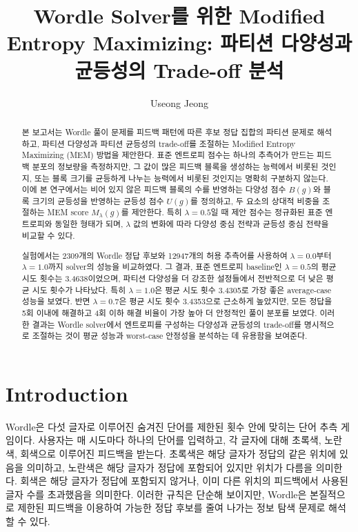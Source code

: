 \documentclass[11pt]{article}
\title{Wordle Solver를 위한 Modified Entropy Maximizing: 파티션 다양성과 균등성의 Trade-off 분석}
\author{
    Useong Jeong
}
\date{}
\begin{document}
\maketitle


\begin{abstract}
본 보고서는 Wordle 풀이 문제를 피드백 패턴에 따른 후보 정답 집합의 파티션 문제로 해석하고,
파티션 다양성과 파티션 균등성의 trade-off를 조절하는 Modified Entropy Maximizing (MEM) 방법을 제안한다.
표준 엔트로피 점수는 하나의 추측어가 만드는 피드백 분포의 정보량을 측정하지만,
그 값이 많은 피드백 블록을 생성하는 능력에서 비롯된 것인지,
또는 블록 크기를 균등하게 나누는 능력에서 비롯된 것인지는 명확히 구분하지 않는다.
이에 본 연구에서는 비어 있지 않은 피드백 블록의 수를 반영하는 다양성 점수 $B(g)$와
블록 크기의 균등성을 반영하는 균등성 점수 $U(g)$를 정의하고,
두 요소의 상대적 비중을 조절하는 MEM score $M_{\lambda}(g)$를 제안한다.
특히 $\lambda = 0.5$일 때 제안 점수는 정규화된 표준 엔트로피와 동일한 형태가 되며,
$\lambda$ 값의 변화에 따라 다양성 중심 전략과 균등성 중심 전략을 비교할 수 있다.

실험에서는 2309개의 Wordle 정답 후보와 12947개의 허용 추측어를 사용하여
$\lambda = 0.0$부터 $\lambda = 1.0$까지 solver의 성능을 비교하였다.
그 결과, 표준 엔트로피 baseline인 $\lambda = 0.5$의 평균 시도 횟수는 3.4638이었으며,
파티션 다양성을 더 강조한 설정들에서 전반적으로 더 낮은 평균 시도 횟수가 나타났다.
특히 $\lambda = 1.0$은 평균 시도 횟수 3.4305로 가장 좋은 average-case 성능을 보였다.
반면 $\lambda = 0.7$은 평균 시도 횟수 3.4353으로 근소하게 높았지만,
모든 정답을 5회 이내에 해결하고 4회 이하 해결 비율이 가장 높아 더 안정적인 풀이 분포를 보였다.
이러한 결과는 Wordle solver에서 엔트로피를 구성하는 다양성과 균등성의 trade-off를 명시적으로 조절하는 것이
평균 성능과 worst-case 안정성을 분석하는 데 유용함을 보여준다.
\end{abstract}


\section{Introduction}
\label{sec:introduction}

Wordle은 다섯 글자로 이루어진 숨겨진 단어를 제한된 횟수 안에 맞히는 단어 추측 게임이다.
사용자는 매 시도마다 하나의 단어를 입력하고, 각 글자에 대해 초록색, 노란색, 회색으로 이루어진 피드백을 받는다.
초록색은 해당 글자가 정답의 같은 위치에 있음을 의미하고, 노란색은 해당 글자가 정답에 포함되어 있지만 위치가 다름을 의미한다.
회색은 해당 글자가 정답에 포함되지 않거나, 이미 다른 위치의 피드백에서 사용된 글자 수를 초과했음을 의미한다.
이러한 규칙은 단순해 보이지만, Wordle은 본질적으로 제한된 피드백을 이용하여 가능한 정답 후보를 줄여 나가는 정보 탐색 문제로 해석할 수 있다.
\end{document}
